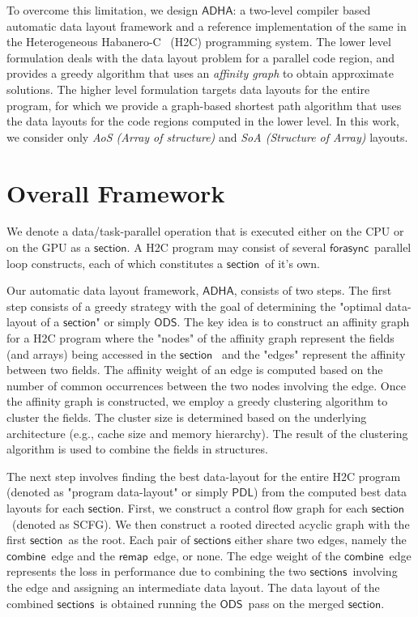 \documentclass{sig-alternate-2013}
\newcommand{\combine}{\ensuremath{\mathsf{combine}}}
\newcommand{\remap}{\ensuremath{\mathsf{remap}}}
\newcommand{\ODS}{\ensuremath{\mathsf{ODS}}}
\newcommand{\PDL}{\ensuremath{\mathsf{PDL}}}
\newcommand{\forasync}{\ensuremath{\mathsf{forasync}}}
\newcommand{\Section}{\ensuremath{\mathsf{section}}}
\newcommand{\Sections}{\ensuremath{\mathsf{sections}}}
\newcommand{\ADHA}{\ensuremath{\mathsf{ADHA}}}
\begin{document}
To overcome this limitation, we design {\ADHA}: a two-level compiler based automatic data layout framework and a
reference implementation of the same in the Heterogeneous Habanero-C~\cite{h2c} (H2C) programming system.
The lower level formulation deals with the data layout problem for a parallel code region, and 
provides a greedy algorithm that uses an {\em affinity graph} to obtain approximate solutions. 
 The higher level formulation targets data layouts for the entire program, 
for which we provide a graph-based shortest path algorithm that uses the data
layouts for the code regions computed in the lower level. In this work, we consider only \textit{AoS (Array of structure)} 
and \textit{SoA (Structure of Array)} layouts. \section{Overall Framework}
We denote a data/task-parallel operation that is executed either on the CPU or on the GPU as a \Section. 
A H2C program may consist of several \forasync\ parallel loop constructs, each of which constitutes a \Section~of it's own.

Our automatic data layout framework, {\ADHA}, consists of two steps. The first step consists of a greedy strategy with the goal of determining the
 "optimal data-layout of a \Section" or simply {\ODS}.  The key idea is to construct an affinity 
graph for a H2C program where the "nodes" of the affinity graph represent the fields (and arrays) being accessed 
in the \Section~ and the "edges" represent the affinity between two fields. The affinity weight of an edge is computed
 based on the number of common occurrences between the two nodes involving the edge.
 Once the affinity graph is constructed, we employ a greedy clustering algorithm to cluster the fields. The cluster size is 
determined based on the underlying architecture (e.g., cache size and memory hierarchy). The result of the clustering
 algorithm is used to combine the fields in structures. 
 
 The next step involves finding the best data-layout for the entire H2C program (denoted as "program data-layout" or simply \PDL) 
from the computed best data layouts for each \Section. First,
 we construct a control flow graph for each \Section~(denoted as SCFG). We then construct a rooted directed acyclic graph with the first \Section~as the root. Each pair of {\Sections} either share two edges, namely the \combine~edge and the \remap~edge, or none.
 The edge weight of the \combine~edge represents the loss in performance due to combining the two \Sections~involving
 the edge and assigning an intermediate data layout. The data layout of the combined \Sections~is obtained running the \ODS~pass on the merged \Section.
  
\end{document}

